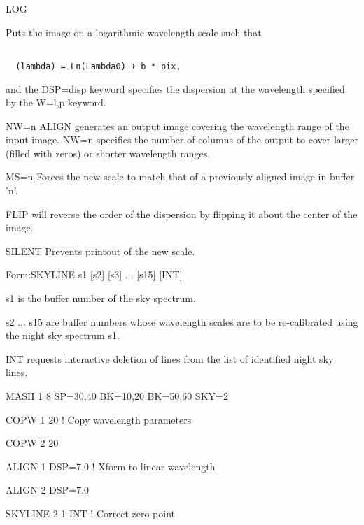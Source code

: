 {\newpage\clearpage
{}%
\begin{example} 
  \item[LOG\hfill]{Puts the image on a logarithmic wavelength scale such
       that
       \begin{verbatim}

  (lambda) = Ln(Lambda0) + b * pix,\end{verbatim}
       and the DSP=disp keyword specifies the dispersion at the wavelength
       specified by the W=l,p keyword.}
\par\item[NW=n \hfill]{ALIGN generates an output image covering the
       wavelength range of the input image. NW=n specifies the number of
       columns of the output to cover larger (filled with zeros) or shorter
       wavelength ranges.}
\par\item[MS=n\hfill]{Forces the new scale to match that of a previously
       aligned image in buffer 'n'.}
\par\item[FLIP\hfill]{will reverse the order of the dispersion by flipping it
       about the center of the image.}
\par\item[SILENT\hfill]{Prevents printout of the new scale.}
\end{example}%
\lthtmlfigureZ
\lthtmlcheckvsize\clearpage}

{\newpage\clearpage
{}%
\begin{command}
  \item[Form:SKYLINE s1 {[s2]} {[s3]} ... {[s15]} {[INT]}\hfill]{}
  \item[s1]{is the buffer number of the sky spectrum.}
  \item[s2 ... s15]{are buffer numbers whose wavelength
       scales are to be re-calibrated using the night sky spectrum s1.}
  \item[INT]{requests interactive deletion of lines
       from the list of identified night sky lines.}
\end{command}%
\lthtmlfigureZ
\lthtmlcheckvsize\clearpage}

{\newpage\clearpage
{}%
\begin{example}
  \item[MASH 1 8 SP=30,40 BK=10,20 BK=50,60 SKY=2\hfill]{}
  \item[COPW 1 20\hfill]{! Copy wavelength parameters}
  \item[COPW 2 20\hfill]{}
  \item[ALIGN 1 DSP=7.0\hfill]{! Xform to linear wavelength}
  \item[ALIGN 2 DSP=7.0\hfill]{}
  \item[SKYLINE 2 1 INT\hfill]{! Correct zero-point}
\end{example}%
\lthtmlfigureZ
\lthtmlcheckvsize\clearpage}

